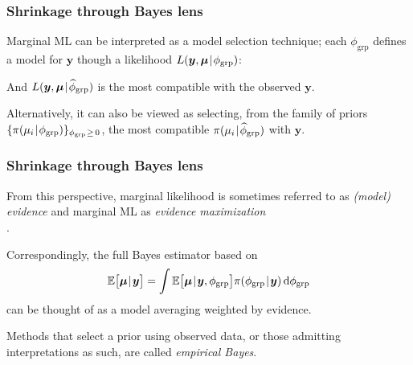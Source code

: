 \documentclass[18pt, handout]{beamer}
\newcommand{\defineTightSpacing}{%
	\setlength{\abovedisplayskip}{.25\baselineskip}%
	\setlength{\belowdisplayskip}{.25\baselineskip}%
}
\renewcommand{\textsc}[1]{{\small \MakeUppercase{#1}}}
\newcommand{\given}{\thinnerspace | \thinnerspace}
\newcommand{\diff}{\operatorname{\mathrm{d}}\!{}}
\newcommand{\thinnerspace}{\mskip.5\thinmuskip}
\newcommand{\expectation}{\mathbb{E}}
\newcommand{\density}{\pi}
\newcommand{\likelihood}{L}
\newcommand{\by}{\bm{y}}
\newcommand{\bmu}{\bm{\mu}}
\begin{document}
\begin{frame}
\frametitle{Shrinkage through Bayes lens}
Marginal {\small ML} can be interpreted as a model selection technique;
each $\phi_{\mathrm{grp}}$ defines a model for $\by$ though a likelihood $\likelihood(\by, \bmu \given \phi_{\mathrm{grp}})$:
\vspace*{-.4\baselineskip}
\begin{figure} 
\end{figure}
\vspace*{-.7\baselineskip}

And $\likelihood(\by, \bmu \given \widehat{\phi}_{\mathrm{grp}})$ is the most compatible with the observed $\by$.

\smallskip
Alternatively, it can also be viewed as selecting, from the family of priors $\{ \density(\mu_i \given \phi_{\mathrm{grp}}) \}_{ \phi_{\mathrm{grp}} \thinnerspace \geq \, 0 } $, the most compatible $\density(\mu_i \given \widehat{\phi}_{\mathrm{grp}})$ with $\by$.
\end{frame}

\begin{frame}
\frametitle{Shrinkage through Bayes lens}

From this perspective, marginal likelihood is sometimes referred to as \textit{(model) evidence} and marginal \textsc{ML} as \textit{evidence maximization}\\
\hfill \citep{mackay1992bayesian_model_comparison}.%

Correspondingly, the full Bayes estimator based on
\begin{equation*} \defineTightSpacing%
\expectation\big[
	\bmu \given \by
\big]
	= \int \expectation\big[
		\bmu \given \by, \phi_{\mathrm{grp}}
	\big] \density(\phi_{\mathrm{grp}} \given \by) \diff \phi_{\mathrm{grp}}
\end{equation*}
can be thought of as a model averaging weighted by evidence.

\smallskip
Methods that select a prior using observed data, or those admitting interpretations as such, are called \textit{empirical Bayes}.
\end{frame}
\end{document}

